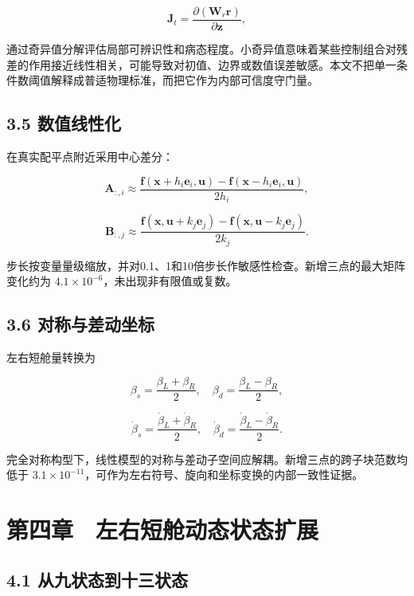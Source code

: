 \[\mathbf{J}_t=\frac{\partial(\mathbf{W}_r\mathbf{r})}{\partial\mathbf{z}},\]

通过奇异值分解评估局部可辨识性和病态程度。小奇异值意味着某些控制组合对残差的作用接近线性相关，可能导致对初值、边界或数值误差敏感。本文不把单一条件数阈值解释成普适物理标准，而把它作为内部可信度守门量。

\section{3.5 数值线性化}\label{35-ux6570ux503cux7ebfux6027ux5316}

在真实配平点附近采用中心差分：

\[\mathbf{A}_{:,i}\approx
\frac{\mathbf{f}(\mathbf{x}+h_i\mathbf{e}_i,\mathbf{u})
-\mathbf{f}(\mathbf{x}-h_i\mathbf{e}_i,\mathbf{u})}{2h_i},\]

\[\mathbf{B}_{:,j}\approx
\frac{\mathbf{f}(\mathbf{x},\mathbf{u}+k_j\mathbf{e}_j)
-\mathbf{f}(\mathbf{x},\mathbf{u}-k_j\mathbf{e}_j)}{2k_j}.\]

步长按变量量级缩放，并对0.1、1和10倍步长作敏感性检查。新增三点的最大矩阵变化约为
\(4.1\times10^{-6}\)，未出现非有限值或复数。

\section{3.6
对称与差动坐标}\label{36-ux5bf9ux79f0ux4e0eux5deeux52a8ux5750ux6807}

左右短舱量转换为

\[\beta_s=\frac{\beta_L+\beta_R}2,\quad
\beta_d=\frac{\beta_L-\beta_R}2,\]

\[\dot\beta_s=\frac{\dot\beta_L+\dot\beta_R}2,\quad
\dot\beta_d=\frac{\dot\beta_L-\dot\beta_R}2.\]

完全对称构型下，线性模型的对称与差动子空间应解耦。新增三点的跨子块范数均低于
\(3.1\times10^{-11}\)，可作为左右符号、旋向和坐标变换的内部一致性证据。

\chapter{第四章　左右短舱动态状态扩展}\label{ux7b2cux56dbux7ae0-ux5de6ux53f3ux77edux8231ux52a8ux6001ux72b6ux6001ux6269ux5c55}

\section{4.1
从九状态到十三状态}\label{41-ux4eceux4e5dux72b6ux6001ux5230ux5341ux4e09ux72b6ux6001}

